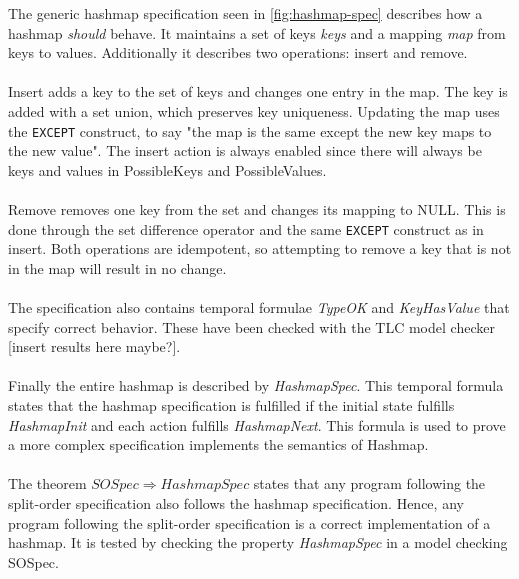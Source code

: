 \documentclass{uit-thesis}
\begin{document}
The generic hashmap specification seen in \autoref{fig:hashmap-spec} describes how a hashmap \textit{should} behave. It maintains a set of keys \textit{keys} and a mapping \textit{map} from keys to values. Additionally it describes two operations: insert and remove.
\\\\
Insert adds a key to the set of keys and changes one entry in the map. The key is added with a set union, which preserves key uniqueness. Updating the map uses the \texttt{EXCEPT} construct, to say "the map is the same except the new key maps to the new value". The insert action is always enabled since there will always be keys and values in PossibleKeys and PossibleValues.
\\\\
Remove removes one key from the set and changes its mapping to NULL. This is done through the set difference operator and the same \texttt{EXCEPT} construct as in insert. Both operations are idempotent, so attempting to remove a key that is not in the map will result in no change.
\\\\
The specification also contains temporal formulae \textit{TypeOK} and \textit{KeyHasValue} that specify correct behavior. These have been checked with the TLC model checker [insert results here maybe?].
\\\\
Finally the entire hashmap is described by \textit{HashmapSpec}. This temporal formula states that the hashmap specification is fulfilled if the initial state fulfills \textit{HashmapInit} and each action fulfills \textit{HashmapNext}. This formula is used to prove a more complex specification implements the semantics of Hashmap.
\\\\
The theorem $SOSpec \Rightarrow HashmapSpec$ states that any program following the split-order specification also follows the hashmap specification. Hence, any program following the split-order specification is a correct implementation of a hashmap. It is tested by checking the property \textit{HashmapSpec} in a model checking SOSpec.
\end{document}
